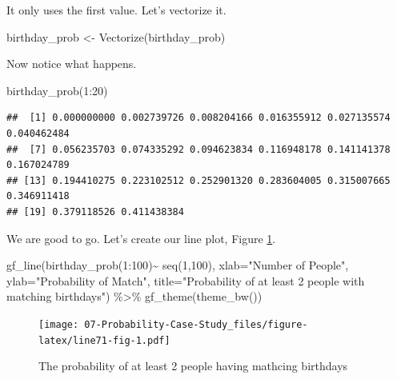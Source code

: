 \documentclass[
]{book}
\newenvironment{Shaded}{\begin{snugshade}}{\end{snugshade}}
\newcommand{\AttributeTok}[1]{\textcolor[rgb]{0.77,0.63,0.00}{#1}}
\newcommand{\DecValTok}[1]{\textcolor[rgb]{0.00,0.00,0.81}{#1}}
\newcommand{\FunctionTok}[1]{\textcolor[rgb]{0.00,0.00,0.00}{#1}}
\newcommand{\NormalTok}[1]{#1}
\newcommand{\OtherTok}[1]{\textcolor[rgb]{0.56,0.35,0.01}{#1}}
\newcommand{\SpecialCharTok}[1]{\textcolor[rgb]{0.00,0.00,0.00}{#1}}
\newcommand{\StringTok}[1]{\textcolor[rgb]{0.31,0.60,0.02}{#1}}
\begin{document}
It only uses the first value. Let's vectorize it.

\begin{Shaded}
\begin{Highlighting}[]
\NormalTok{birthday\_prob }\OtherTok{\textless{}{-}} \FunctionTok{Vectorize}\NormalTok{(birthday\_prob)}
\end{Highlighting}
\end{Shaded}

Now notice what happens.

\begin{Shaded}
\begin{Highlighting}[]
\FunctionTok{birthday\_prob}\NormalTok{(}\DecValTok{1}\SpecialCharTok{:}\DecValTok{20}\NormalTok{)}
\end{Highlighting}
\end{Shaded}

\begin{verbatim}
##  [1] 0.000000000 0.002739726 0.008204166 0.016355912 0.027135574 0.040462484
##  [7] 0.056235703 0.074335292 0.094623834 0.116948178 0.141141378 0.167024789
## [13] 0.194410275 0.223102512 0.252901320 0.283604005 0.315007665 0.346911418
## [19] 0.379118526 0.411438384
\end{verbatim}

We are good to go. Let's create our line plot, Figure \ref{fig:line71-fig}.

\begin{Shaded}
\begin{Highlighting}[]
\FunctionTok{gf\_line}\NormalTok{(}\FunctionTok{birthday\_prob}\NormalTok{(}\DecValTok{1}\SpecialCharTok{:}\DecValTok{100}\NormalTok{)}\SpecialCharTok{\textasciitilde{}} \FunctionTok{seq}\NormalTok{(}\DecValTok{1}\NormalTok{,}\DecValTok{100}\NormalTok{),}
        \AttributeTok{xlab=}\StringTok{"Number of People"}\NormalTok{,}
        \AttributeTok{ylab=}\StringTok{"Probability of Match"}\NormalTok{,}
        \AttributeTok{title=}\StringTok{"Probability of at least 2 people with matching birthdays"}\NormalTok{) }\SpecialCharTok{\%\textgreater{}\%}
  \FunctionTok{gf\_theme}\NormalTok{(}\FunctionTok{theme\_bw}\NormalTok{())}
\end{Highlighting}
\end{Shaded}

\begin{figure}
\centering
\texttt{[image: 07-Probability-Case-Study\_files/figure-latex/line71-fig-1.pdf]}
\caption{\label{fig:line71-fig}The probability of at least 2 people having mathcing birthdays}
\end{figure}
\end{document}
